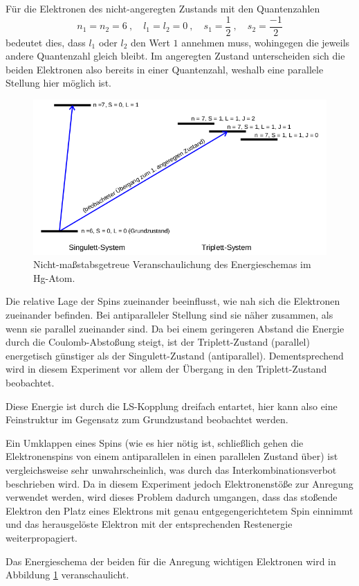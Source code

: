 Für die Elektronen des nicht-angeregten Zustands mit den Quantenzahlen 
\begin{equation*}
    n_1=n_2=6\:,\quad l_1=l_2=0\:,\quad s_1=\frac{1}{2}\:,\quad s_2=\frac{-1}{2}
\end{equation*}
bedeutet dies, dass $l_1$ oder $l_2$ den Wert $1$ annehmen muss, wohingegen die jeweils andere Quantenzahl gleich bleibt. 
Im angeregten Zustand unterscheiden sich die beiden Elektronen also bereits in einer Quantenzahl, weshalb eine parallele Stellung 
hier möglich ist. 

\begin{figure}
    \centering
    \includegraphics[width=\textwidth]{plots/Energieschema.png}
    \caption{Nicht-maßstabsgetreue Veranschaulichung des Energieschemas im Hg-Atom\cite{Versuchsanleitung}.}
    \label{fig:Energieschema}
\end{figure}

Die relative Lage der Spins zueinander beeinflusst, wie nah sich die Elektronen zueinander befinden. Bei antiparalleler Stellung 
sind sie näher zusammen, als wenn sie parallel zueinander sind. 
Da bei einem geringeren Abstand die Energie durch die Coulomb-Abstoßung steigt, ist der Triplett-Zustand (parallel) energetisch 
günstiger als der Singulett-Zustand (antiparallel).
Dementsprechend wird in diesem Experiment vor allem der Übergang in den Triplett-Zustand beobachtet. 

Diese Energie ist durch die LS-Kopplung dreifach entartet, hier kann also eine Feinstruktur im Gegensatz zum Grundzustand beobachtet werden. 

Ein Umklappen eines Spins (wie es hier nötig ist, schließlich gehen die Elektronenspins von einem antiparallelen in einen 
parallelen Zustand über) ist vergleichsweise sehr unwahrscheinlich, was durch das Interkombinationsverbot beschrieben wird. 
Da in diesem Experiment jedoch Elektronenstöße zur Anregung verwendet werden, wird dieses Problem dadurch umgangen, dass 
das stoßende Elektron den Platz eines Elektrons mit genau entgegengerichtetem Spin einnimmt und das herausgelöste Elektron mit 
der entsprechenden Restenergie weiterpropagiert. 

Das Energieschema der beiden für die Anregung wichtigen Elektronen wird in Abbildung \ref{fig:Energieschema} veranschaulicht. 
